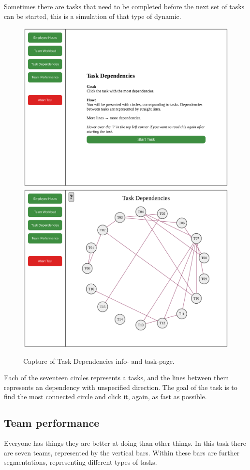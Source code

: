 {		Sometimes there are tasks that need to be completed before the next set of
		tasks can be started, this is a simulation of that type of dynamic.

    \begin{figure}[h!]
      \centering
      \includegraphics[width=.49\textwidth]{figures/captures/webapp_dependencies_info.pdf}
      \includegraphics[width=.49\textwidth]{figures/captures/webapp_dependencies_task.pdf}
      \caption{Capture of Task Dependencies info- and task-page.}
    \end{figure}

		Each of the seventeen circles represents a tasks, and the lines between
		them represents an dependency with unspecified direction. The goal of the
		task is to find the most connected circle and click it, again, as fast as
		possible.

    \subsection{Team performance}

		Everyone has things they are better at doing than other things. In this
		task there are seven teams, represented by the vertical bars. Within these
		bars are further segmentations, representing different types of tasks.

}
